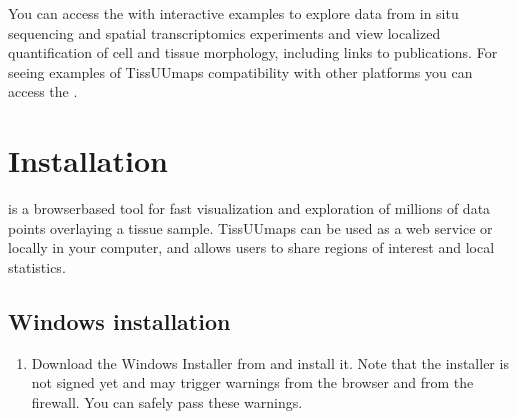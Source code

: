 \documentclass[letterpaper,10pt,english,openany,oneside]{sphinxmanual}
\begin{document}
\sphinxAtStartPar
You can access the  with interactive examples to explore data from in situ sequencing and spatial transcriptomics experiments and view localized quantification of cell and tissue morphology, including links to publications. For seeing examples of TissUUmaps compatibility with other platforms you can access the .

\sphinxstepscope


\section{Installation}
\label{\detokenize{docs/intro/installation:installation}}\label{\detokenize{docs/intro/installation::doc}}
\sphinxAtStartPar
{} is a browser\sphinxhyphen{}based tool for fast visualization and exploration of millions of data points overlaying a tissue sample. TissUUmaps can be used as a web service or locally in your computer, and allows users to share regions of interest and local statistics.


\subsection{Windows installation}
\label{\detokenize{docs/intro/installation:windows-installation}}\begin{enumerate}
%
\item {} 
\sphinxAtStartPar
Download the Windows Installer from  and install it. Note that the installer is not signed yet and may trigger warnings from the browser and from the firewall. You can safely pass these warnings.

\end{enumerate}
\end{document}
